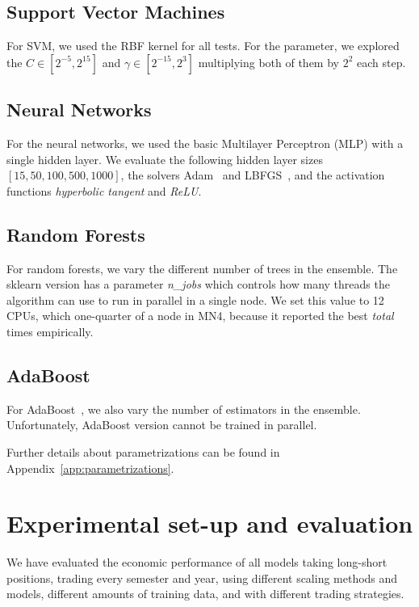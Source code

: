 \subsection{Support Vector Machines}

For SVM, we used the RBF kernel for all tests. For the parameter, we explored the $C \in [2^{-5}, 2^{15}]$ and $\gamma \in [2^{-15}, 2^{3}]$ multiplying both of them by $2^2$ each step.


\subsection{Neural Networks}

For the neural networks, we used the basic Multilayer Perceptron (MLP) with a  single hidden layer. We evaluate the following hidden layer sizes $[15, 50, 100, 500, 1000]$, the solvers Adam~\cite{kingma2014adam} and LBFGS~\cite{lbfgs}, and the activation functions \textit{hyperbolic tangent} and \textit{ReLU}.
\subsection{Random Forests}

For random forests, we vary the different number of trees in the ensemble. The sklearn version has a parameter \textit{n\_jobs} which controls how many threads the algorithm can use to run in parallel in a single node. We set this value to 12 CPUs, which one-quarter of a node in MN4, because it reported the best \emph{total} times empirically.

\subsection{AdaBoost}

For AdaBoost~\cite{adaboost}, we also vary the number of estimators in the ensemble. Unfortunately, AdaBoost version cannot be trained in parallel.

\bigskip
Further details about parametrizations can be found in Appendix~\ref{app:parametrizations}.


\section{Experimental set-up and evaluation}

We have evaluated the economic performance of all models taking long-short positions, trading every semester and year, using different scaling methods and models, different amounts of training data, and with different trading strategies. 

